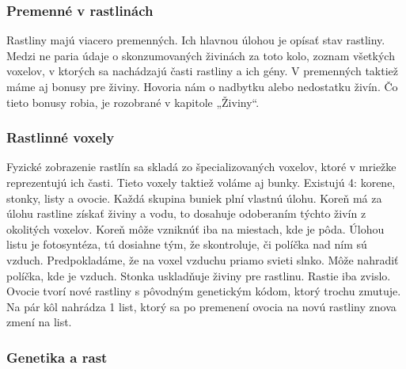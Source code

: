 \documentclass[12pt]{article}
\begin{document}
\subsubsection{Premenné v rastlinách}

Rastliny majú viacero premenných. Ich hlavnou úlohou je opísať stav rastliny.
Medzi ne paria údaje o skonzumovaných živinách za toto kolo, zoznam všetkých
voxelov, v ktorých sa nachádzajú časti rastliny a ich gény. V premenných
taktiež máme aj bonusy pre živiny. Hovoria nám o nadbytku alebo nedostatku
živín. Čo tieto bonusy robia, je rozobrané v kapitole „Živiny“.

\subsubsection{Rastlinné voxely}

Fyzické zobrazenie rastlín sa skladá zo špecializovaných voxelov, ktoré
v mriežke reprezentujú ich časti. Tieto voxely taktiež voláme aj bunky.
Existujú 4: korene, stonky, listy a ovocie. Každá skupina buniek plní
vlastnú úlohu. Koreň má za úlohu rastline získať živiny a vodu, to dosahuje
odoberaním týchto živín z okolitých voxelov. Koreň môže vzniknúť iba na
miestach, kde je pôda. Úlohou listu je fotosyntéza, tú dosiahne tým, že
skontroluje, či políčka nad ním sú vzduch. Predpokladáme, že na voxel vzduchu
priamo svieti slnko. Môže nahradiť políčka, kde je vzduch. Stonka uskladňuje
živiny pre rastlinu.  Rastie iba zvislo. Ovocie tvorí nové rastliny
s pôvodným genetickým kódom, ktorý trochu zmutuje. Na pár kôl nahrádza 1 list,
ktorý sa po premenení ovocia na novú rastliny znova zmení na list.

\subsubsection{Genetika a rast}
\end{document}
